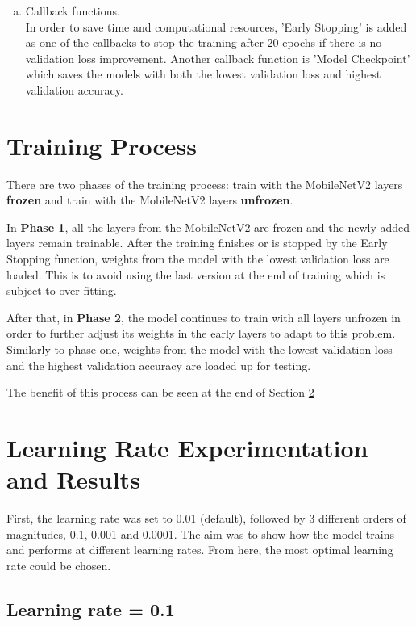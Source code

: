 \documentclass[]{article}
\begin{document}
\begin{enumerate}[(a)]
    
    \item Callback functions.\\
    In order to save time and computational resources, 'Early Stopping' is added as one of the callbacks to stop the training after 20 epochs if there is no validation loss improvement. Another callback function is 'Model Checkpoint' which saves the models with both the lowest validation loss and highest validation accuracy. 
    
\end{enumerate}

\section{Training Process} \label{training_process}
There are two phases of the training process: train with the MobileNetV2 layers \textbf{frozen} and train with the MobileNetV2 layers \textbf{unfrozen}.

In \textbf{Phase 1}, all the layers from the MobileNetV2 are frozen and the newly added layers remain trainable. After the training finishes or is stopped by the Early Stopping function, weights from the model with the lowest validation loss are loaded. This is to avoid using the last version at the end of training which is subject to over-fitting.  

After that, in \textbf{Phase 2}, the model continues to train with all layers unfrozen in order to further adjust its weights in the early layers to adapt to this problem. Similarly to phase one, weights from the model with the lowest validation loss and the highest validation accuracy are loaded up for testing. 

The benefit of this process can be seen at the end of Section \ref{LRsection}

\section{Learning Rate Experimentation and Results} \label{LRsection}
First, the learning rate was set to 0.01 (default), followed by 3 different orders of magnitudes, 0.1, 0.001 and 0.0001. The aim was to show how the model trains and performs at different learning rates. From here, the most optimal learning rate could be chosen.

\subsection{Learning rate = 0.1} \label{LR01section}
\end{document}
